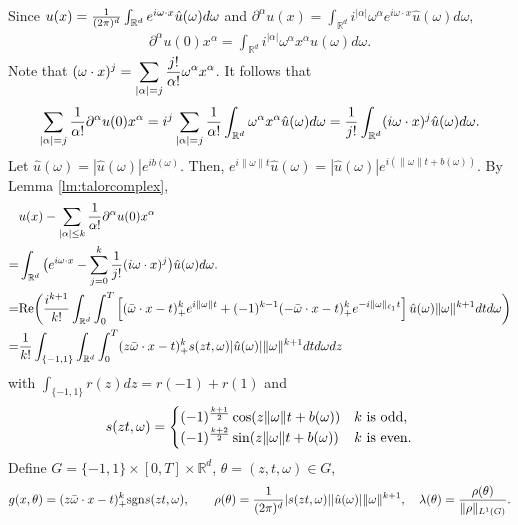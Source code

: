 Since $
u(x) = {1\over (2\pi)^d}\int_{\mathbb{R}^d} e^{i\omega\cdot x}\hat{u}(\omega)d\omega
$
and 
$
 \partial^\alpha u(x)=\int_{\mathbb{R}^d} i^{|\alpha|}\omega^\alpha e^{i\omega\cdot x}\hat{u}(\omega)d\omega,
$
\begin{eqnarray}
 \partial^\alpha u(0)x^\alpha=\int_{\mathbb{R}^d} i^{|\alpha|}\omega^\alpha x^\alpha\hat{u}(\omega)d\omega.
\end{eqnarray} 
Note that $\displaystyle (\omega\cdot x)^j=\sum_{|\alpha|=j}{j!\over \alpha !}\omega^\alpha x^\alpha $. It follows that
\begin{equation}
\sum_{|\alpha|=j}{1\over \alpha!} \partial^\alpha u(0) x^\alpha=i^j\sum_{|\alpha|=j}{1\over \alpha!} \int_{\mathbb{R}^d} \omega^\alpha x^\alpha\hat{u}(\omega)d\omega
={1\over j!}  \int_{\mathbb{R}^d} (i\omega\cdot x)^j \hat{u}(\omega)d\omega.
\end{equation} 
Let $\hat{u}(\omega)=|\hat{u}(\omega)|e^{ib(\omega)}$. Then, $e^{i\|\omega\|t}\hat{u}(\omega) = |\hat{u}(\omega)|e^{i(\|\omega\|t + b(\omega))}$.
By Lemma \ref{lm:talorcomplex},
\begin{equation}\label{eq:fftaylor}
\begin{split}
&u(x) - \sum_{|\alpha|\le k}{1\over \alpha!} \partial^\alpha u(0) x^\alpha
\\
= &\int_{\mathbb{R}^d} \big (e^{i\omega\cdot x}-\sum_{j=0}^k{1\over j!}(i\omega\cdot x)^j\big )\hat{u}(\omega)d\omega.
\\
=&{\rm Re} \bigg ({i^{k+1}\over k!}\int_{\mathbb{R}^d} \int_{0}^T\left[(\bar \omega\cdot x - t)_+^ke^{i\|\omega\|t}
+(-1)^{k-1}(-\bar \omega\cdot x - t)_+^ke^{-i\|\omega\|_{\ell_1}t} \right]\hat{u}(\omega)\|\omega\|^{k+1}dt d\omega\bigg )
\\
=& {1\over k!}\int_{\{-1,1\}}\int_{\mathbb{R}^d} \int_{0}^T (z\bar \omega\cdot x - t)_+^k s(zt,\omega)  |\hat{u}(\omega)|\|\omega\|^{k+1}dtd\omega dz
\end{split}
\end{equation}
with $\int_{\{-1, 1\}} r(z) dz = r(-1) + r(1)$ and
\begin{equation} 
s(zt,\omega)= 
\begin{cases}
(-1)^{k+1\over 2}\cos(z\|\omega\|t + b(\omega)) & k \text{ is odd},
\\
(-1)^{k+2\over 2}\sin(z\|\omega\|t + b(\omega)) & k \text{ is even}.
\end{cases}
\end{equation} 
Define $G=\{-1,1\}\times [0,T]\times \mathbb{R}^{d}$, $\theta=(z, t, \omega)\in G$,
\begin{equation}\label{eq:straglam}
g(x,\theta)= (z\bar \omega\cdot x - t)_+^k {\rm sgn} s(zt,\omega),\qquad  \rho(\theta) = {1\over (2\pi)^d}|s(zt,\omega)||\hat{u}(\omega)|\|\omega\|^{k+1},\quad \lambda(\theta)={\rho(\theta)\over 
\|\rho\|_{L^1(G)}}.
\end{equation} 

